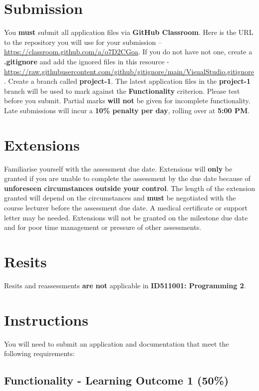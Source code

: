 \documentclass{article}
\begin{document}
\section*{Submission}
You \textbf{must} submit all application files via \textbf{GitHub Classroom}. Here is the URL to the repository you will use for your submission – \href{https://classroom.github.com/a/o7D2CGoa}{https://classroom.github.com/a/o7D2CGoa}. If you do not have not one, create a \textbf{.gitignore} and add the ignored files in this resource - \href{https://raw.githubusercontent.com/github/gitignore/main/VisualStudio.gitignore}{https://raw.githubusercontent.com/github/gitignore/main/VisualStudio.gitignore}. Create a branch called \textbf{project-1}. The latest application files in the \textbf{project-1} branch will be used to mark against the \textbf{Functionality} criterion. Please test before you submit. Partial marks \textbf{will not} be given for incomplete functionality. Late submissions will incur a \textbf{10\% penalty per day}, rolling over at \textbf{5:00 PM}.

\section*{Extensions}
Familiarise yourself with the assessment due date. Extensions will \textbf{only} be granted if you are unable to complete the assessment by the due date because of \textbf{unforeseen circumstances outside your control}. The length of the extension granted will depend on the circumstances and \textbf{must} be negotiated with the course lecturer before the assessment due date. A medical certificate or support letter may be needed. Extensions will not be granted on the milestone due date and for poor time management or pressure of other assessments.

\section*{Resits}
Resits and reassessments \textbf{are not} applicable in \textbf{ID511001: Programming 2}.

\section*{Instructions}
You will need to submit an application and documentation that meet the following requirements:\\

\subsection*{Functionality - Learning Outcome 1 (50\%)}
\end{document}
